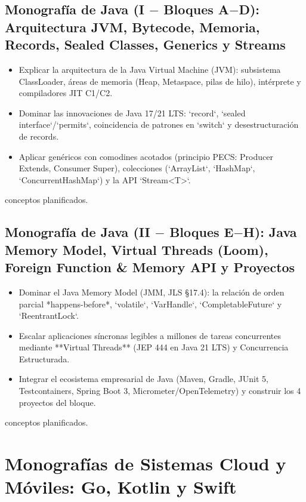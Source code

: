 \documentclass{book}
\begin{document}
\subsection*{\checkmark Monografía de Java (I \(-\) Bloques A\(-\)D): Arquitectura JVM, Bytecode, Memoria, Records, Sealed Classes, Generics y Streams}
\begin{itemize}
\item Explicar la arquitectura de la Java Virtual Machine (JVM): subsistema ClassLoader, áreas de memoria (Heap, Metaspace, pilas de hilo), intérprete y compiladores JIT C1/C2.
\item Dominar las innovaciones de Java 17/21 LTS: `record`, `sealed interface`/`permits`, coincidencia de patrones en `switch` y desestructuración de records.
\item Aplicar genéricos con comodines acotados (principio PECS: Producer Extends, Consumer Super), colecciones (`ArrayList`, `HashMap`, `ConcurrentHashMap`) y la API `Stream<T>`.
\end{itemize}
 conceptos planificados.

\subsection*{\checkmark Monografía de Java (II \(-\) Bloques E\(-\)H): Java Memory Model, Virtual Threads (Loom), Foreign Function \& Memory API y Proyectos}
\begin{itemize}
\item Dominar el Java Memory Model (JMM, JLS §17.4): la relación de orden parcial *happens-before*, `volatile`, `VarHandle`, `CompletableFuture` y `ReentrantLock`.
\item Escalar aplicaciones síncronas legibles a millones de tareas concurrentes mediante **Virtual Threads** (JEP 444 en Java 21 LTS) y Concurrencia Estructurada.
\item Integrar el ecosistema empresarial de Java (Maven, Gradle, JUnit 5, Testcontainers, Spring Boot 3, Micrometer/OpenTelemetry) y construir los 4 proyectos del bloque.
\end{itemize}
 conceptos planificados.

\section*{Monografías de Sistemas Cloud y Móviles: Go, Kotlin y Swift}
\end{document}
